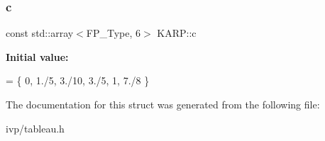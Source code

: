 \subsubsection{\texorpdfstring{c}{c}}
{\footnotesize\ttfamily const std\+::array$<$F\+P\+\_\+\+Type, 6$>$ K\+A\+R\+P\+::c}

{\bfseries Initial value\+:}
\begin{DoxyCode}
= \{
    0, 1./5, 3./10, 3./5, 1, 7./8
  \}
\end{DoxyCode}


The documentation for this struct was generated from the following file\+:\begin{DoxyCompactItemize}
\item 
ivp/tableau.\+h\end{DoxyCompactItemize}
